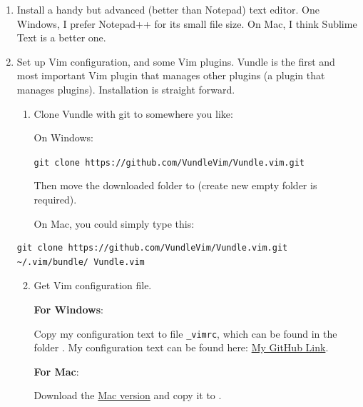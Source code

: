 \documentclass{article}
\begin{document}
\begin{enumerate}
    \item Install a handy but advanced (better than Notepad) text
        editor. One Windows, I prefer Notepad++ for its small file
        size. On Mac, I think Sublime Text is a better one.

    \item Set up Vim configuration, and some Vim plugins. Vundle is
        the first and most important Vim plugin that manages other
        plugins (a plugin that manages plugins). Installation is
        straight forward. 
        
        \begin{enumerate}
            \item Clone Vundle with git to somewhere you like:

                On Windows:

                \texttt{\footnotesize git clone
                https://github.com/VundleVim/Vundle.vim.git}

                Then move the downloaded folder to  (create new empty
                folder is required).

                On Mac, you could simply type this:

        \end{enumerate}
            
\begin{verbatim}
git clone https://github.com/VundleVim/Vundle.vim.git ~/.vim/bundle/ Vundle.vim
\end{verbatim}

        \begin{enumerate}
            \setcounter{enumii}{1}
            \item Get Vim configuration file.
                
                \textbf{For Windows}:
                
                Copy my configuration text to file \texttt{\_vimrc},
                which can be found in the folder . My configuration text can be found here:
                \href{https://github.com/we-taper/vimConfig/blob/master/_vimrc}
                {My GitHub Link}.

                \textbf{For Mac}:

                Download the
                \href{https://raw.githubusercontent.com/we-taper/vimConfig/master/vimrc-mac}{Mac
                version} and copy it to .


\end{enumerate}
\end{enumerate}
\end{document}
